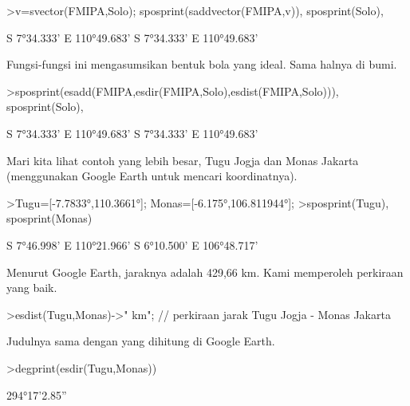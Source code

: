\documentclass[a4paper,10pt]{article}
\begin{document}
\begin{eulernotebook}
\begin{eulercomment}
\begin{eulercomment}
\begin{eulercomment}
\begin{eulercomment}
\begin{eulercomment}
\begin{eulercomment}
\begin{eulercomment}
\begin{eulercomment}
\begin{eulercomment}
\begin{eulercomment}
\begin{eulercomment}
\begin{eulercomment}
\begin{eulercomment}
\begin{eulercomment}
\begin{eulercomment}
\begin{eulercomment}
\begin{eulercomment}
\begin{eulercomment}
\begin{eulercomment}
\end{eulercomment}
\begin{eulerprompt}
>v=svector(FMIPA,Solo); sposprint(saddvector(FMIPA,v)), sposprint(Solo),
\end{eulerprompt}
\begin{euleroutput}
  S 7°34.333' E 110°49.683'
  S 7°34.333' E 110°49.683'
\end{euleroutput}
\begin{eulercomment}
Fungsi-fungsi ini mengasumsikan bentuk bola yang ideal. Sama halnya di
bumi.
\end{eulercomment}
\begin{eulerprompt}
>sposprint(esadd(FMIPA,esdir(FMIPA,Solo),esdist(FMIPA,Solo))), sposprint(Solo),
\end{eulerprompt}
\begin{euleroutput}
  S 7°34.333' E 110°49.683'
  S 7°34.333' E 110°49.683'
\end{euleroutput}
\begin{eulercomment}
Mari kita lihat contoh yang lebih besar, Tugu Jogja dan Monas Jakarta
(menggunakan Google Earth untuk mencari koordinatnya).
\end{eulercomment}
\begin{eulerprompt}
>Tugu=[-7.7833°,110.3661°]; Monas=[-6.175°,106.811944°];
>sposprint(Tugu), sposprint(Monas)
\end{eulerprompt}
\begin{euleroutput}
  S 7°46.998' E 110°21.966'
  S 6°10.500' E 106°48.717'
\end{euleroutput}
\begin{eulercomment}
Menurut Google Earth, jaraknya adalah 429,66 km. Kami memperoleh
perkiraan yang baik.
\end{eulercomment}
\begin{eulerprompt}
>esdist(Tugu,Monas)->" km"; // perkiraan jarak Tugu Jogja - Monas Jakarta
\end{eulerprompt}
\begin{eulercomment}
Judulnya sama dengan yang dihitung di Google Earth.
\end{eulercomment}
\begin{eulerprompt}
>degprint(esdir(Tugu,Monas))
\end{eulerprompt}
\begin{euleroutput}
  294°17'2.85''
\end{euleroutput}
\begin{eulercomment}

\end{eulercomment}
\end{eulercomment}
\end{eulercomment}
\end{eulercomment}
\end{eulercomment}
\end{eulercomment}
\end{eulercomment}
\end{eulercomment}
\end{eulercomment}
\end{eulercomment}
\end{eulercomment}
\end{eulercomment}
\end{eulercomment}
\end{eulercomment}
\end{eulercomment}
\end{eulercomment}
\end{eulercomment}
\end{eulercomment}
\end{eulercomment}
\end{eulernotebook}
\end{document}

